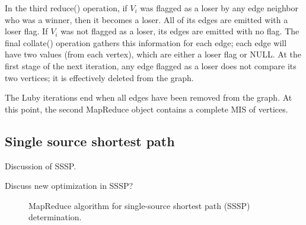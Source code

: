 In the third reduce() operation, if $V_i$ was flagged as a loser by
any edge neighbor who was a winner, then it becomes a loser.  All of
its edges are emitted with a loser flag.  If $V_i$ was not flagged as
a loser, its edges are emitted with no flag.  The final collate()
operation gathers this information for each edge; each edge will have
two values (from each vertex), which are either a loser flag or NULL.
At the first stage of the next iteration, any edge flagged as a loser
does not compare its two vertices; it is effectively deleted from the
graph.

The Luby iterations end when all edges have been removed from the
graph.  At this point, the second MapReduce object contains a complete
MIS of vertices.

\subsection{Single source shortest path}

Discussion of SSSP.

Discuss new optimization in SSSP?

\begin{figure}[htb]
 \begin{center}\end{center}

 \caption{MapReduce algorithm for single-source shortest path (SSSP)
 determination.}

 \label{fig:sssp}
\end{figure}
